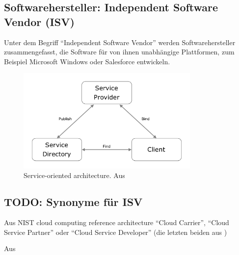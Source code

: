 
\subsection{Softwarehersteller: Independent Software Vendor (ISV)}
\label{cha:isv}
Unter dem Begriff "`Independent Software Vendor"' werden Softwarehersteller 
zusammengefasst, die Software für von ihnen unabhängige Plattformen, zum 
Beispiel Microsoft Windows oder Salesforce entwickeln.

\begin{figure}[!h]
\begin{center}
\includegraphics[width=0.8\textwidth]{images/soa_architecture.png}
\caption{Service-oriented architecture. Aus 
\protect{}}
\label{fig:soa_architecture}
\end{center}
\end{figure}

\subsection{TODO: Synonyme für ISV}
Aus NIST cloud computing reference architecture "`Cloud Carrier"', 
"`Cloud Service Partner"' oder "`Cloud Service Developer"' (die letzten beiden 
aus )


Aus 
